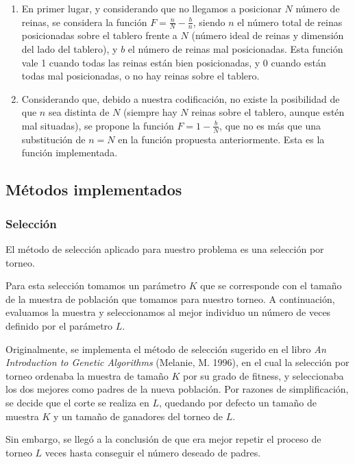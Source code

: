 \documentclass[12pt]{article}
\begin{document}
\begin{enumerate}
    \item En primer lugar, y considerando que no llegamos a posicionar $N$ número de reinas, se considera la función $F=\frac{n}{N} - \frac{b}{n}$, siendo $n$ el número total de reinas posicionadas sobre el tablero frente a $N$ (número ideal de reinas y dimensión del lado del tablero), y $b$ el número de reinas mal posicionadas. Esta función vale 1 cuando todas las reinas están bien posicionadas, y 0 cuando están todas mal posicionadas, o no hay reinas sobre el tablero.
    \item Considerando que, debido a nuestra codificación, no existe la posibilidad de que $n$ sea distinta de $N$ (siempre hay $N$ reinas sobre el tablero, aunque estén mal situadas), se propone la función $F=1-\frac{b}{N}$, que no es más que una substitución de $n=N$ en la función propuesta anteriormente. Esta es la función implementada.
\end{enumerate}

\subsection{Métodos implementados}

\subsubsection{Selección}

El método de selección aplicado para nuestro problema es una selección por torneo.

Para esta selección tomamos un parámetro $K$ que se corresponde con el tamaño de la muestra de población que tomamos para nuestro torneo. A continuación, evaluamos la muestra y seleccionamos al mejor individuo un número de veces definido por el parámetro $L$.

Originalmente, se implementa el método de selección sugerido en el libro \emph{An Introduction to Genetic Algorithms} (Melanie, M. 1996), en el cual la selección por torneo ordenaba la muestra de tamaño $K$ por su grado de fitness, y seleccionaba los dos mejores como padres de la nueva población. Por razones de simplificación, se decide que el corte se realiza en $L$, quedando por defecto un tamaño de muestra $K$ y un tamaño de ganadores del torneo de $L$.

Sin embargo, se llegó a la conclusión de que era mejor repetir el proceso de torneo $L$ veces hasta conseguir el número deseado de padres.
\end{document}
